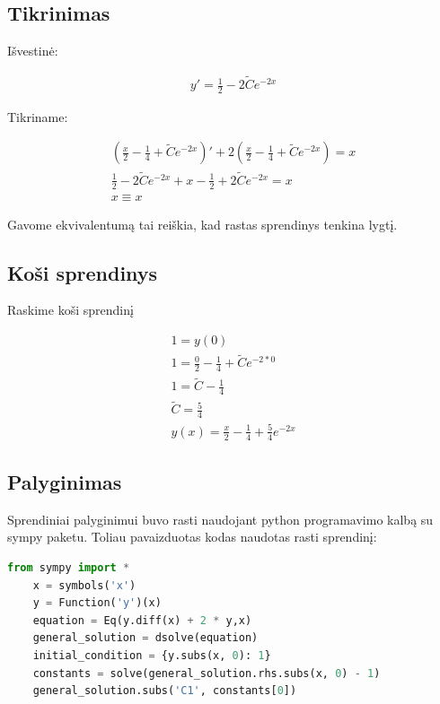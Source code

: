 \documentclass[11pt]{article}
\begin{document}
\subsection{Tikrinimas}

Išvestinė:

\begin{equation}
\begin{split}
y'=\frac{1}{2}-2\widetilde{C}e^{-2x}
\end{split}
\end{equation}

Tikriname:

\begin{equation}
\begin{split}
\left(\frac{x}{2}-\frac{1}{4}+\widetilde{C}e^{-2x}\right)'+2\left(\frac{x}{2}-\frac{1}{4}+\widetilde{C}e^{-2x}\right)=x\\
\frac{1}{2}-2\widetilde{C}e^{-2x}+x-\frac{1}{2}+2\widetilde{C}e^{-2x}=x\\
x\equiv x
\end{split}
\end{equation}

Gavome ekvivalentumą tai reiškia, kad rastas sprendinys tenkina lygtį.

\subsection*{Koši sprendinys}

Raskime koši sprendinį

\begin{equation}
\begin{split}
1=y(0)\\
1=\frac{0}{2}-\frac{1}{4}+\widetilde{C}e^{-2*0}\\
1=\widetilde{C}-\frac{1}{4}\\
\widetilde{C}=\frac{5}{4}\\
y(x)=\frac{x}{2}-\frac{1}{4}+\frac{5}{4}e^{-2x}
\end{split}
\end{equation}

\newpage
\subsection{Palyginimas}

Sprendiniai palyginimui buvo rasti naudojant 
python programavimo kalbą su sympy paketu. 
Toliau pavaizduotas kodas naudotas rasti sprendinį:

\begin{lstlisting}[language=Python]
    from sympy import *
    x = symbols('x')
    y = Function('y')(x)
    equation = Eq(y.diff(x) + 2 * y,x)
    general_solution = dsolve(equation)
    initial_condition = {y.subs(x, 0): 1}
    constants = solve(general_solution.rhs.subs(x, 0) - 1)
    general_solution.subs('C1', constants[0])
\end{lstlisting}
\end{document}
